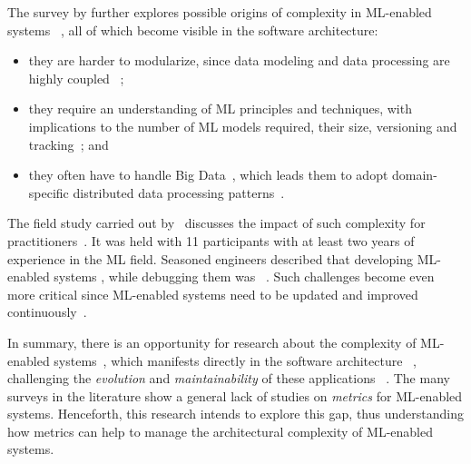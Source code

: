   The survey by \citeauthor{Diaz-De-Arcaya2023ASurvey} further
  explores possible origins of complexity in ML-enabled systems%
  ~\parencite{Diaz-De-Arcaya2023ASurvey}, all of which become
  visible in the software architecture:
  \begin{itemize}
    \item they are harder to modularize,
          since data modeling and data processing are highly coupled%
          ~\parencite{Wan2021HowPractices};
    \item they require an understanding of ML principles and techniques, 
          with implications to the number of ML models required, their size,
          versioning and tracking~\parencite{Lwakatare2020Large-ScaleSolutions,
          Priestley2023APipelines}; and
    \item they often have to handle Big Data~\parencite{Sagiroglu2013BigReview},
          which leads them to adopt domain-specific distributed data
          processing patterns~\parencite{Amershi2019SoftwareStudy,
          Benton2020MachineApplications,Foidl2024DataDevelopers}.
  \end{itemize}
  
  The field study carried out by~\citeauthor{Hilllaz2016TrialsStudy} discusses the
  impact of such complexity for practitioners~\parencite{Hilllaz2016TrialsStudy}.
  It was held with 11 participants with at least two years of experience
  in the ML field.
    Seasoned engineers described that developing ML-enabled systems
    ,
    while debugging them was
  ~\parencite{Hilllaz2016TrialsStudy}.
  Such challenges become even more critical since ML-enabled systems need
  to be updated and improved continuously~\parencite{Wan2021HowPractices}.

  In summary, there is an opportunity for research about the complexity
  of ML-enabled systems~\parencite{Giray2021AChallenges,
  Shankar2022OperationalizingStudy,Tamburri2020SustainableChallenges},
  which manifests directly in the software architecture%
  ~\parencite{Diaz-De-Arcaya2023ASurvey}, challenging the \emph{evolution}
  and \emph{maintainability} of these applications%
  ~\parencite{Hilllaz2016TrialsStudy,Wan2021HowPractices}.
  The many surveys in the literature show a general lack of studies
  on \emph{metrics} for ML-enabled systems. Henceforth, this research
  intends to explore this gap, thus understanding how metrics can help
  to manage the architectural complexity of ML-enabled systems.

